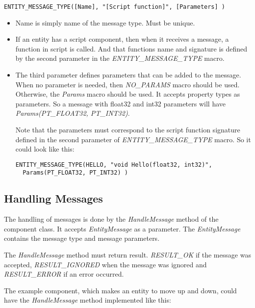 \documentclass[a4paper, 12pt]{report}
\begin{document}
\begin{verbatim}
ENTITY_MESSAGE_TYPE([Name], "[Script function]", [Parameters] )
\end{verbatim}

\begin{itemize}
\item
Name is simply name of the message type. Must be unique.
\item
If an entity has a script component, then when it receives a message, a function in script is called. And that functions name and signature is defined by the second parameter in the \emph{ENTITY\_MESSAGE\_TYPE} macro.
\item
The third parameter defines parameters that can be added to the message. When no parameter is needed, then \emph{NO\_PARAMS} macro should be used. Otherwise, the \emph{Params} macro should be used. It accepts property types as parameters. So a message with float32 and int32 parameters will have \emph{Params(PT\_FLOAT32, PT\_INT32)}.

Note that the parameters must correspond to the script function signature defined in the second parameter of \emph{ENTITY\_MESSAGE\_TYPE} macro. So it could look like this: 

\begin{verbatim}
ENTITY_MESSAGE_TYPE(HELLO, "void Hello(float32, int32)",
  Params(PT_FLOAT32, PT_INT32) )
\end{verbatim}

\end{itemize}

\subsection{Handling Messages}

 The handling of messages is done by the \emph{HandleMessage} method of the component class. It accepts \emph{EntityMessage} as a parameter. The \emph{EntityMessage} contains the message type and message parameters. 

The \emph{HandleMessage} method must return result. \emph{RESULT\_OK} if the message was accepted, \emph{RESULT\_IGNORED} when the message was ignored and \emph{RESULT\_ERROR} if an error occurred.

The example component, which makes an entity to move up and down, could have the \emph{HandleMessage} method implemented like this:
\end{document}
